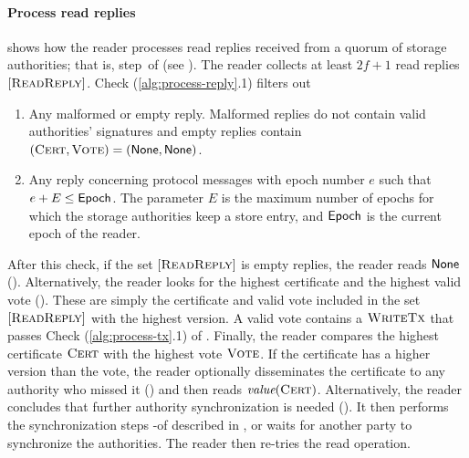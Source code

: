 \paragraph{Process read replies}
 shows how the reader processes read replies received from a quorum of storage authorities; that is, step~\ten of  (see ). The reader collects at least $2f+1$ read replies $[\textsc{ReadReply}]$.
%
Check (\ref{alg:process-reply}.1) filters out
\begin{enumerate}
    \item Any malformed or empty reply. Malformed replies do not contain valid authorities' signatures and empty replies contain $(\textsc{Cert}, \textsc{Vote}) = (\textsf{None}, \textsf{None})$.
    \item Any reply concerning protocol messages with epoch number $e$ such that $e + E \leq \textsf{Epoch}$. The parameter $E$ is the maximum number of epochs for which the storage authorities keep a store entry, and $\textsf{Epoch}$ is the current epoch of the reader.
\end{enumerate}
After this check, if the set $[\textsc{ReadReply}]$ is empty replies, the reader reads $\textsf{None}$ ().
%
Alternatively, the reader looks for the highest certificate and the highest valid vote (). These are simply the certificate and valid vote included in the set $[\textsc{ReadReply}]$ with the highest version. A valid vote contains a $\textsc{WriteTx}$ that passes Check (\ref{alg:process-tx}.1) of .
%
Finally, the reader compares the highest certificate $\textsc{Cert}$ with the highest vote $\textsc{Vote}$. If the certificate has a higher version than the vote, the reader optionally disseminates the certificate to any authority who missed it () and then reads $\emph{value}(\textsc{Cert})$.
%
Alternatively, the reader concludes that further authority synchronization is needed (). It then performs the synchronization steps \four-\seven of  described in , or waits for another party to synchronize the authorities. The reader then re-tries the read operation.


